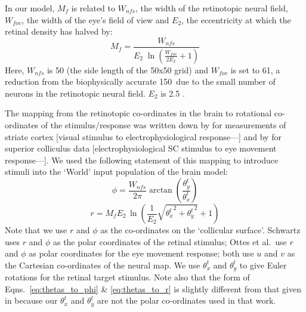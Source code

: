 \documentclass{frontiersSCNS}
\begin{document}
In our model, $M_f$ is related to $W_{nfs}$, the width of the
retinotopic neural field, $W_{fov}$, the width of the eye's field of
view and $E_2$, the eccentricity at which the retinal density has
halved by:
\begin{equation} \label{eq:fm}
   M_f = \frac {W_{nfs}} {E_2\;\ln\left(\frac{W_{fov}}{2 E_2} + 1\right)}
\end{equation}
Here, $W_{nfs}$ is 50 (the side length of the 50x50 grid) and
$W_{fov}$ is set to 61\dg, a reduction from the biophysically accurate
150\dg~due to the small number of neurons in the retinotopic neural
field. $E_2$ is
2.5 \citep{cope_basal_2017,slotnick_electrophysiological_2001}.

The mapping from the retinotopic co-ordinates in the brain to
rotational co-ordinates of the stimulus/response was written down by
\cite{schwartz_spatial_1977,eric_l._schwartz_computational_1980}
for measurements of striate cortex [visual stimulus to
electrophysiological response---\cite{daniel_representation_1961,
talbot_physiological_1941}] and by \cite{ottes_visuomotor_1986} for
superior colliculus data [electrophysiological SC stimulus to eye
movement response---\cite{robinson_eye_1972}].
We used the following statement of this mapping to introduce stimuli
into the `World' input population of the brain model:
\begin{equation}\label{eq:thetas_to_phi}
   \phi = \frac{W_{nfs}} {2 \pi}\arctan\left(\frac{\theta_{y}^{t}}{\theta_{x}^{t}}\right)
\end{equation}
\begin{equation}\label{eq:thetas_to_r}
   r = M_fE_2\,\ln\left(\frac{1}{E_2}\sqrt{{\theta_{x}^{t}}^2 + {\theta_{y}^{t}}^2}+1\right)
\end{equation}
Note that we use $r$ and $\phi$ as the co-ordinates on the `collicular
surface'. Schwartz uses $r$ and $\phi$ as the polar coordinates of the
retinal stimulus; Ottes et al.~use $r$ and $\phi$ as polar coordinates
for the eye movement response; both use $u$ and $v$ as the Cartesian
co-ordinates of the neural map. We use $\theta_{x}^{t}$ and
$\theta_{y}^{t}$ to give Euler rotations for the retinal target
stimulus. Note also that the form of
Eqns.~\ref{eq:thetas_to_phi} \& \ref{eq:thetas_to_r} is slightly
different from that given in
\cite{ottes_visuomotor_1986} because our $\theta_{x}^{t}$ and
$\theta_{y}^{t}$ are not the polar co-ordinates used in that work.
\end{document}
